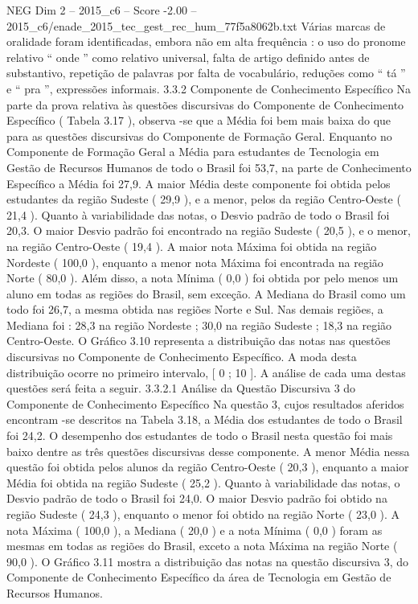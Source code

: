 \begin{textsample}{NEG Dim 2 – 2015\_c6 – Score -2.00 – 2015\_c6/enade\_2015\_tec\_gest\_rec\_hum\_77f5a8062b.txt}
Várias marcas de oralidade foram identificadas, embora não em alta frequência : o uso do pronome relativo “ onde ” como relativo universal, falta de artigo definido antes de substantivo, repetição de palavras por falta de vocabulário, reduções como “ tá ” e “ pra ”, expressões informais. 3.3.2 Componente de Conhecimento Específico Na parte da prova relativa às questões discursivas do Componente de Conhecimento Específico ( Tabela 3.17 ), observa -se que a Média foi bem mais baixa do que para as questões discursivas do Componente de Formação Geral.
Enquanto no Componente de Formação Geral a Média para estudantes de Tecnologia em Gestão de Recursos Humanos de todo o Brasil foi 53,7, na parte de Conhecimento Específico a Média foi 27,9.
A maior Média deste componente foi obtida pelos estudantes da região Sudeste ( 29,9 ), e a menor, pelos da região Centro-Oeste ( 21,4 ).
Quanto à variabilidade das notas, o Desvio padrão de todo o Brasil foi 20,3.
O maior Desvio padrão foi encontrado na região Sudeste ( 20,5 ), e o menor, na região Centro-Oeste ( 19,4 ).
A maior nota Máxima foi obtida na região Nordeste ( 100,0 ), enquanto a menor nota Máxima foi encontrada na região Norte ( 80,0 ).
Além disso, a nota Mínima ( 0,0 ) foi obtida por pelo menos um aluno em todas as regiões do Brasil, sem exceção.
A Mediana do Brasil como um todo foi 26,7, a mesma obtida nas regiões Norte e Sul.
Nas demais regiões, a Mediana foi : 28,3 na região Nordeste ; 30,0 na região Sudeste ; 18,3 na região Centro-Oeste.
O Gráfico 3.10 representa a distribuição das notas nas questões discursivas no Componente de Conhecimento Específico.
A moda desta distribuição ocorre no primeiro intervalo, [ 0 ; 10 ].
A análise de cada uma destas questões será feita a seguir. 3.3.2.1 Análise da Questão Discursiva 3 do Componente de Conhecimento Específico Na questão 3, cujos resultados aferidos encontram -se descritos na Tabela 3.18, a Média dos estudantes de todo o Brasil foi 24,2.
O desempenho dos estudantes de todo o Brasil nesta questão foi mais baixo dentre as três questões discursivas desse componente.
A menor Média nessa questão foi obtida pelos alunos da região Centro-Oeste ( 20,3 ), enquanto a maior Média foi obtida na região Sudeste ( 25,2 ).
Quanto à variabilidade das notas, o Desvio padrão de todo o Brasil foi 24,0.
O maior Desvio padrão foi obtido na região Sudeste ( 24,3 ), enquanto o menor foi obtido na região Norte ( 23,0 ).
A nota Máxima ( 100,0 ), a Mediana ( 20,0 ) e a nota Mínima ( 0,0 ) foram as mesmas em todas as regiões do Brasil, exceto a nota Máxima na região Norte ( 90,0 ).
O Gráfico 3.11 mostra a distribuição das notas na questão discursiva 3, do Componente de Conhecimento Específico da área de Tecnologia em Gestão de Recursos Humanos.

\end{textsample}
